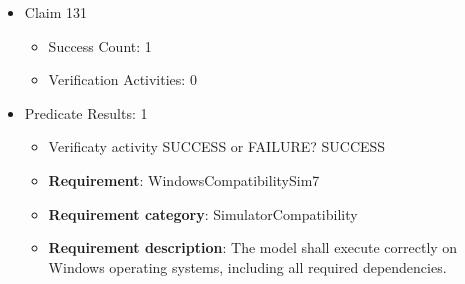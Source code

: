 \documentclass{article}
\begin{document}
\begin{itemize}
\begin{itemize}
					\item \textbf{Requirement}: RelativePathsSim6 
					\item \textbf{Requirement category}: SimulatorCompatibility
					\item \textbf{Requirement description}: All file references used by the model shall rely on relative paths rather than absolute paths.
					\end{itemize}

  				  \item Claim 131
				\begin{itemize}
			    	\item Success Count: 1 
			    	\item Verification Activities: 0
				\end{itemize}
				
									    
				\item Predicate Results: 1
					\begin{itemize}				
					\item Verificaty activity SUCCESS or FAILURE? SUCCESS
					
					\item \textbf{Requirement}: WindowsCompatibilitySim7 
					\item \textbf{Requirement category}: SimulatorCompatibility
					\item \textbf{Requirement description}: The model shall execute correctly on Windows operating systems, including all required dependencies.
					\end{itemize}

			\end{itemize}

		
\end{document}
